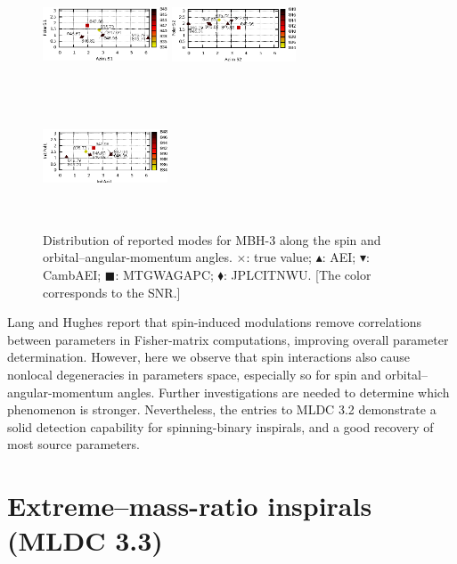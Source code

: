 \documentclass{iopart}
\begin{document}
\begin{figure}
\includegraphics[width=0.33\textwidth,height=3.5cm]{DirS1_srcMC2_SNR.eps}
\includegraphics[width=0.33\textwidth,height=3.5cm]{DirS2_srcMC2_SNR.eps}
\includegraphics[width=0.33\textwidth,height=3.5cm]{DirL_srcMC2_SNR.eps}
\caption{Distribution of reported modes for MBH-3 along the spin and orbital--angular-momentum angles.
$\times$: true value; $\blacktriangle$: AEI; $\blacktriangledown$: CambAEI; $\blacksquare$: MTGWAGAPC; $\blacklozenge$: JPLCITNWU. [The color corresponds to the SNR.]
\label{fig:SMBH_spinLdeg}}
\end{figure}

Lang and Hughes \cite{SpinBBHLangHughes} report that spin-induced modulations remove correlations between parameters in Fisher-matrix computations, improving overall parameter determination. However, here we observe that spin interactions also cause nonlocal degeneracies in parameters space, especially so for spin and orbital--angular-momentum angles. Further investigations are needed to determine which phenomenon is stronger. Nevertheless, the entries to MLDC 3.2 demonstrate a solid detection capability for spinning-binary inspirals, and a good recovery of most source parameters.

\section{Extreme--mass-ratio inspirals (MLDC 3.3)}
\end{document}

